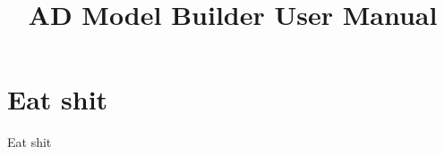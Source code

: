 \documentclass{article}
\title{AD Model Builder User Manual}
\begin{document}
\maketitle
\section{Eat shit}
Eat shit
\end{document}
